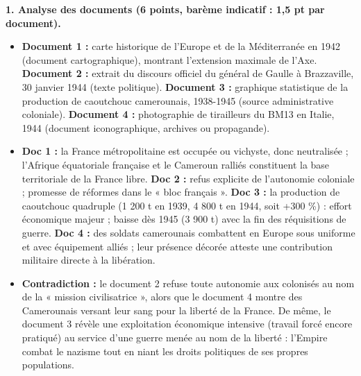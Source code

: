 \documentclass[11pt]{article}
\begin{document}
\begin{corrige}
\textbf{1. Analyse des documents (6 points, barème indicatif : 1,5 pt par document).}
\begin{itemize}
\item[a.] \textbf{Document 1 :} carte historique de l'Europe et de la Méditerranée en 1942 (document cartographique), montrant l'extension maximale de l'Axe. \textbf{Document 2 :} extrait du discours officiel du général de Gaulle à Brazzaville, 30 janvier 1944 (texte politique). \textbf{Document 3 :} graphique statistique de la production de caoutchouc camerounais, 1938-1945 (source administrative coloniale). \textbf{Document 4 :} photographie de tirailleurs du BM13 en Italie, 1944 (document iconographique, archives ou propagande).
\item[b.] \textbf{Doc 1 :} la France métropolitaine est occupée ou vichyste, donc neutralisée ; l'Afrique équatoriale française et le Cameroun ralliés constituent la base territoriale de la France libre. \textbf{Doc 2 :} refus explicite de l'autonomie coloniale ; promesse de réformes dans le « bloc français ». \textbf{Doc 3 :} la production de caoutchouc quadruple (1 200 t en 1939, 4 800 t en 1944, soit +300 \%) : effort économique majeur ; baisse dès 1945 (3 900 t) avec la fin des réquisitions de guerre. \textbf{Doc 4 :} des soldats camerounais combattent en Europe sous uniforme et avec équipement alliés ; leur présence décorée atteste une contribution militaire directe à la libération.
\item[c.] \textbf{Contradiction :} le document 2 refuse toute autonomie aux colonisés au nom de la « mission civilisatrice », alors que le document 4 montre des Camerounais versant leur sang pour la liberté de la France. De même, le document 3 révèle une exploitation économique intensive (travail forcé encore pratiqué) au service d'une guerre menée au nom de la liberté : l'Empire combat le nazisme tout en niant les droits politiques de ses propres populations.
\end{itemize}


\end{corrige}
\end{document}

